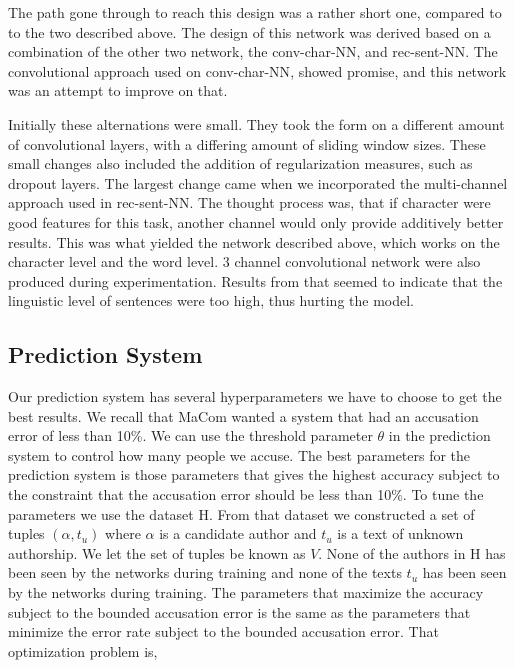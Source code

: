 The path gone through to reach this design was a rather short one, compared
to to the two described above. The design of this network was derived based
on a combination of the other two network, the \gls{conv-char-NN}, and
\gls{rec-sent-NN}. The convolutional approach used on \gls{conv-char-NN},
showed promise, and this network was an attempt to improve on that.

Initially these alternations were small. They took the form on a different
amount of convolutional layers, with a differing amount of sliding window sizes.
These small changes also included the addition of regularization measures,
such as dropout layers. The largest change came when we incorporated the
multi-channel approach used in \gls{rec-sent-NN}. The thought process was,
that if character were good features for this task, another channel would
only provide additively better results. This was what yielded the network
described above, which works on the character level and the word level. 3
channel convolutional network were also produced during experimentation. Results
from that seemed to indicate that the linguistic level of sentences were too
high, thus hurting the model.

\subsection{Prediction System}

Our prediction system has several hyperparameters we have to choose to get
the best results. We recall that MaCom wanted a system that had an accusation
error of less than 10\%. We can use the threshold parameter $\theta$ in the
prediction system to control how many people we accuse. The best parameters
for the prediction system is those parameters that gives the highest accuracy
subject to the constraint that the accusation error should be less than 10\%. To
tune the parameters we use the dataset \gls{H}. From that dataset we constructed
a set of tuples $(\alpha, t_u)$ where $\alpha$ is a candidate author and $t_u$
is a text of unknown authorship. We let the set of tuples be known as $V$. None
of the authors in \gls{H} has been seen by the networks during training and none
of the texts $t_u$ has been seen by the networks during training. The parameters
that maximize the accuracy subject to the bounded accusation error is the same
as the parameters that minimize the error rate subject to the bounded accusation
error. That optimization problem is,

